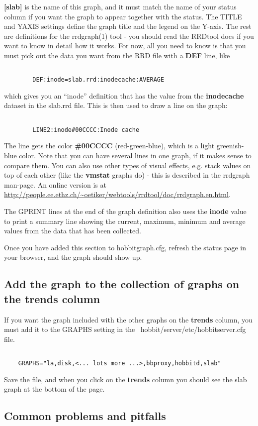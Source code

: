  \textbf{[slab]}
 is the name of this graph, and it must match the name of your status column if you want the graph to appear together with the status. The TITLE and YAXIS settings define the graph title and the legend on the Y-axis. The rest are definitions for the rrdgraph(1) tool - you should read the RRDtool docs if you want to know in detail how it works. For now, all you need to know is that you must pick out the data you want from the RRD file with a \textbf{DEF}
 line, like \begin{verbatim}

		DEF:inode=slab.rrd:inodecache:AVERAGE

\end{verbatim}
 which gives you an ``inode'' definition that has the value from the \textbf{inodecache}
 dataset in the slab.rrd file. This is then used to draw a line on the graph: \begin{verbatim}

		LINE2:inode#00CCCC:Inode cache

\end{verbatim}
 The line gets the color \textbf{\#00CCCC}
 (red-green-blue), which is a light greenish-blue color. Note that you can have several lines in one graph, if it makes sense to compare them. You can also use other types of visual effects, e.g. stack values on top of each other (like the \textbf{vmstat}
 graphs do) - this is described in the rrdgraph man-page. An online version is at  \url{http://people.ee.ethz.ch/~oetiker/webtools/rrdtool/doc/rrdgraph.en.html}.


 The GPRINT lines at the end of the graph definition also uses the \textbf{inode}
 value to print a summary line showing the current, maximum, minimum and average values from the data that has been collected.


 Once you have added this section to hobbitgraph.cfg, refresh the status page in your browser, and the graph should show up.
\subsection{Add the graph to the collection of graphs on the trends column}


 If you want the graph included with the other graphs on the \textbf{trends}
 column, you must add it to the GRAPHS setting in the ~hobbit/server/etc/hobbitserver.cfg file.
\begin{verbatim}

	GRAPHS="la,disk,<... lots more ...>,bbproxy,hobbitd,slab"

\end{verbatim}
 Save the file, and when you click on the \textbf{trends}
 column you should see the slab graph at the bottom of the page. \subsection{Common problems and pitfalls}
